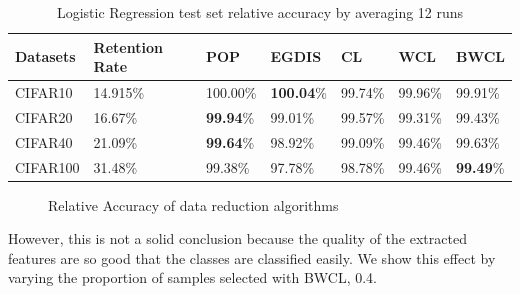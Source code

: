  
\begin{table}
    \centering
    \begin{tabular}{|l|l|l|l|l|l|l|}
    \hline
        Datasets & Retention Rate  & POP & EGDIS & CL & WCL & BWCL \\ \hline
        CIFAR10 & 14.915\% & 100.00\% & \textbf{100.04}\% & 99.74\% & 99.96\% & 99.91\% \\ \hline
        CIFAR20 & 16.67\% & \textbf{99.94}\% & 99.01\% & 99.57\% & 99.31\% & 99.43\% \\ \hline
        CIFAR40 & 21.09\% & \textbf{99.64}\% & 98.92\% & 99.09\% & 99.46\% & 99.63\% \\ \hline
        CIFAR100 & 31.48\% & 99.38\% & 97.78\% & 98.78\% & 99.46\% & \textbf{99.49}\% \\ \hline
    \end{tabular}
    \caption{Logistic Regression test set relative accuracy by averaging 12 runs}
    \label{132e3213}
\end{table}


\begin{figure}[H]
\centering  
{}
\caption{Relative Accuracy of data reduction algorithms}
\label{Fig.logistic_relativeacc}
\end{figure}

However, this is not a solid conclusion because the quality of the extracted features are so good that the classes are classified easily. We show this effect by varying the proportion of samples selected with BWCL, 0.4.

